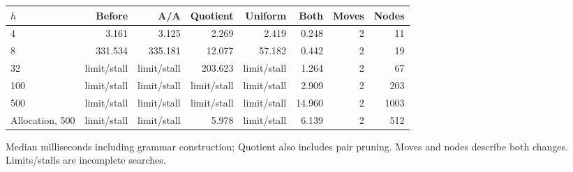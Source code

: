 \begin{center}\footnotesize
\begin{tabular}{@{}lrrrrrrr@{}}
\toprule
$h$ & Before & A/A & Quotient & Uniform & Both & Moves & Nodes \\
\midrule
4 & 3.161 & 3.125 & 2.269 & 2.419 & 0.248 & 2 & 11 \\
8 & 331.534 & 335.181 & 12.077 & 57.182 & 0.442 & 2 & 19 \\
32 & limit/stall & limit/stall & 203.623 & limit/stall & 1.264 & 2 & 67 \\
100 & limit/stall & limit/stall & limit/stall & limit/stall & 2.909 & 2 & 203 \\
500 & limit/stall & limit/stall & limit/stall & limit/stall & 14.960 & 2 & 1003 \\
Allocation, 500 & limit/stall & limit/stall & 5.978 & limit/stall & 6.139 & 2 & 512 \\
\bottomrule
\end{tabular}
\end{center}
Median milliseconds including grammar construction; Quotient also includes pair pruning. Moves and nodes describe both changes. Limits/stalls are incomplete searches.
